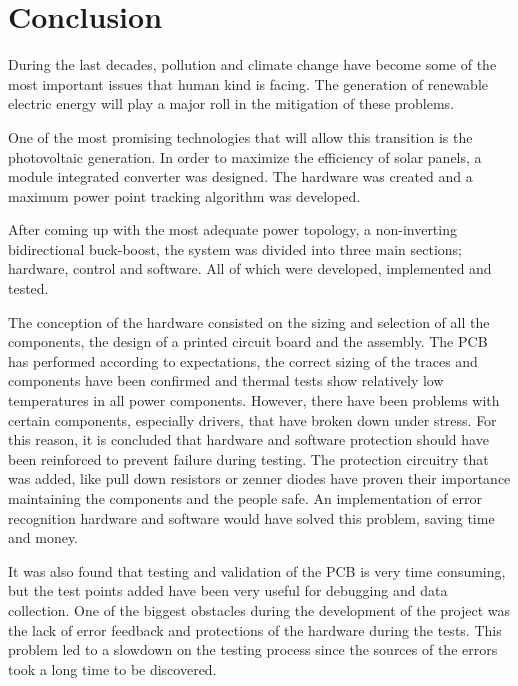 \chapter{Conclusion}\label{ch:conclusion}

During the last decades, pollution and climate change have become some of the most important issues that human kind is facing. The generation of renewable electric energy will play a major roll in the mitigation of these problems.

One of the most promising technologies that will allow this transition is the photovoltaic generation. 
In order to maximize the efficiency of solar panels, a module integrated converter was designed.
The hardware was created and a maximum power point tracking algorithm was developed.

After coming up with the most adequate power topology, a non-inverting bidirectional buck-boost, the system was divided into three main sections; hardware, control and software. All of which were developed, implemented and tested.

The conception of the hardware consisted on the sizing and selection of all the components, the design of a printed circuit board and the assembly. 
The PCB has performed according to expectations, the correct sizing of the traces and components have  been confirmed and thermal tests show relatively low temperatures in all power components. 
However, there have been problems with certain components, especially drivers, that have broken down under stress. For this reason, it is concluded that hardware and software protection should have been reinforced to prevent failure during testing.
The protection circuitry that was added, like pull down resistors or zenner diodes have proven their importance maintaining the components and the people safe. An implementation of error recognition hardware and software would have solved this problem, saving time and money.

It was also found that testing and validation of the PCB is very time consuming, but the test points added have been very useful for debugging and data collection. 
One of the biggest obstacles during the development of the project was the lack of error feedback and protections of the hardware during the tests. This problem led to a slowdown on the testing process since the sources of the errors took a long time to be discovered. 

